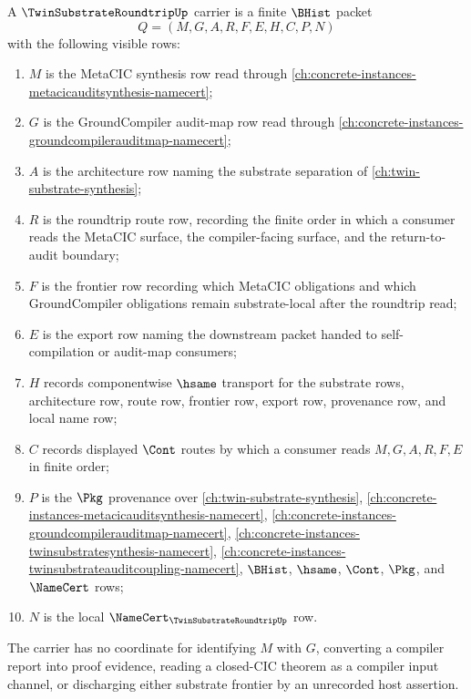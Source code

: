\begin{definition}
\label{def:twin-substrate-roundtrip-packet}
A $\TwinSubstrateRoundtripUp$ carrier is a finite $\BHist$ packet
$$
Q=(M,G,A,R,F,E,H,C,P,N)
$$
with the following visible rows:
\begin{enumerate}
\item $M$ is the MetaCIC synthesis row read through \autoref{ch:concrete-instances-metacicauditsynthesis-namecert};
\item $G$ is the GroundCompiler audit-map row read through \autoref{ch:concrete-instances-groundcompilerauditmap-namecert};
\item $A$ is the architecture row naming the substrate separation of \autoref{ch:twin-substrate-synthesis};
\item $R$ is the roundtrip route row, recording the finite order in which a consumer reads the MetaCIC surface, the compiler-facing surface, and the return-to-audit boundary;
\item $F$ is the frontier row recording which MetaCIC obligations and which GroundCompiler obligations remain substrate-local after the roundtrip read;
\item $E$ is the export row naming the downstream packet handed to self-compilation or audit-map consumers;
\item $H$ records componentwise $\hsame$ transport for the substrate rows, architecture row, route row, frontier row, export row, provenance row, and local name row;
\item $C$ records displayed $\Cont$ routes by which a consumer reads $M,G,A,R,F,E$ in finite order;
\item $P$ is the $\Pkg$ provenance over \autoref{ch:twin-substrate-synthesis}, \autoref{ch:concrete-instances-metacicauditsynthesis-namecert}, \autoref{ch:concrete-instances-groundcompilerauditmap-namecert}, \autoref{ch:concrete-instances-twinsubstratesynthesis-namecert}, \autoref{ch:concrete-instances-twinsubstrateauditcoupling-namecert}, $\BHist$, $\hsame$, $\Cont$, $\Pkg$, and $\NameCert$ rows;
\item $N$ is the local $\NameCert_{\TwinSubstrateRoundtripUp}$ row.
\end{enumerate}
The carrier has no coordinate for identifying $M$ with $G$, converting a compiler report into proof evidence, reading a closed-CIC theorem as a compiler input channel, or discharging either substrate frontier by an unrecorded host assertion.
\end{definition}

